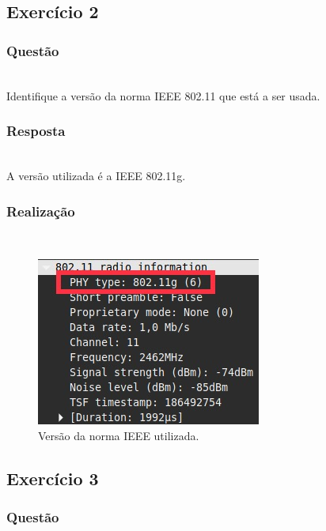 \documentclass{llncs}
\begin{document}
\clearpage
\subsection{Exercício 2}
\subsubsection{Questão}\rule[-10pt]{0pt}{10pt}\\

Identifique a versão da norma IEEE 802.11 que está a ser usada.

\subsubsection{Resposta}\rule[-10pt]{0pt}{10pt}\\

A versão utilizada é a IEEE 802.11g.

\subsubsection{Realização}\rule[-10pt]{0pt}{10pt}\\

\begin{figure}
  \begin{center}
  \includegraphics[scale=0.6]{./imagens/ex2.png} 
  \end{center}
  \caption{Versão da norma IEEE utilizada.}
  \label{fig:norma_ieee}
\end{figure}


\clearpage
\subsection{Exercício 3}
\subsubsection{Questão}\rule[-10pt]{0pt}{10pt}\\
\end{document}
